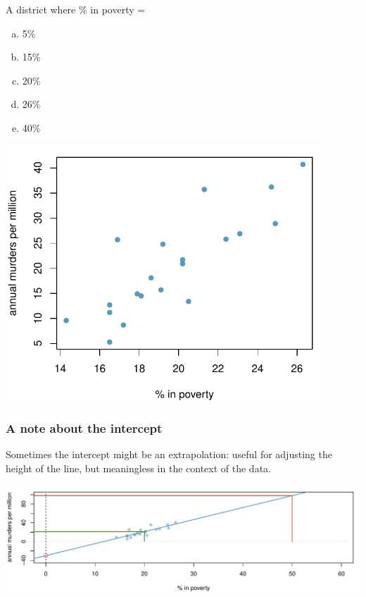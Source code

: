\documentclass[11pt,containsverbatim,handout,xcolor=xelatex,dvipsnames,table]{beamer}
\newcommand{\solnMult}[1]{#1}
\begin{document}
\begin{frame}
\frametitle{}


{
A district where \% in poverty =
\begin{enumerate}[(a)]
\item 5\%
\item 15\%
\item \solnMult{20\%}
\item 26\%
\item 40\%
\end{enumerate}
}
{
\begin{center}
\includegraphics[width=0.9\textwidth]{figures/murder/annual_murders_per_mil_perc_pov}
\end{center}
}

\end{frame}


\begin{frame}
\frametitle{A note about the intercept}

Sometimes the intercept might be an extrapolation: useful for adjusting the height of the line, but meaningless in the context of the data.

\begin{center}
\includegraphics[width=\textwidth]{figures/murder/annual_murders_per_mil_perc_pov_wide}
\end{center}

\end{frame}
\end{document}
